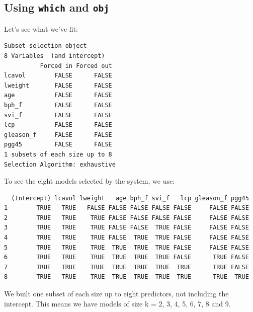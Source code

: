 \documentclass[]{book}
\newenvironment{Shaded}{\begin{snugshade}}{\end{snugshade}}
\newcommand{\OperatorTok}[1]{\textcolor[rgb]{0.81,0.36,0.00}{\textbf{#1}}}
\newcommand{\NormalTok}[1]{#1}
\theoremstyle{definition}
\theoremstyle{definition}
\theoremstyle{definition}
\theoremstyle{remark}
\begin{document}
\subsection{\texorpdfstring{Using \texttt{which} and
\texttt{obj}}{Using which and obj}}\label{using-which-and-obj}

Let's see what we've fit:

\begin{Shaded}
\end{Shaded}

\begin{verbatim}
Subset selection object
8 Variables  (and intercept)
          Forced in Forced out
lcavol        FALSE      FALSE
lweight       FALSE      FALSE
age           FALSE      FALSE
bph_f         FALSE      FALSE
svi_f         FALSE      FALSE
lcp           FALSE      FALSE
gleason_f     FALSE      FALSE
pgg45         FALSE      FALSE
1 subsets of each size up to 8
Selection Algorithm: exhaustive
\end{verbatim}

To see the eight models selected by the system, we use:

\begin{Shaded}
\end{Shaded}

\begin{verbatim}
  (Intercept) lcavol lweight   age bph_f svi_f   lcp gleason_f pgg45
1        TRUE   TRUE   FALSE FALSE FALSE FALSE FALSE     FALSE FALSE
2        TRUE   TRUE    TRUE FALSE FALSE FALSE FALSE     FALSE FALSE
3        TRUE   TRUE    TRUE FALSE FALSE  TRUE FALSE     FALSE FALSE
4        TRUE   TRUE    TRUE FALSE  TRUE  TRUE FALSE     FALSE FALSE
5        TRUE   TRUE    TRUE  TRUE  TRUE  TRUE FALSE     FALSE FALSE
6        TRUE   TRUE    TRUE  TRUE  TRUE  TRUE FALSE      TRUE FALSE
7        TRUE   TRUE    TRUE  TRUE  TRUE  TRUE  TRUE      TRUE FALSE
8        TRUE   TRUE    TRUE  TRUE  TRUE  TRUE  TRUE      TRUE  TRUE
\end{verbatim}

We built one subset of each size up to eight predictors, not including
the intercept. This means we have models of size k = 2, 3, 4, 5, 6, 7, 8
and 9.
\end{document}
